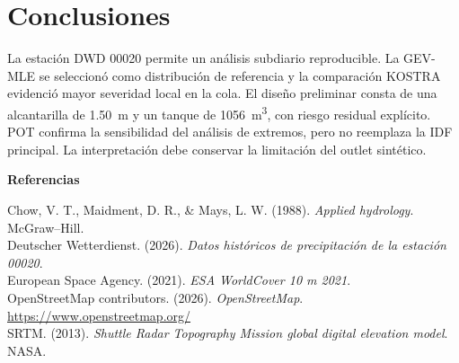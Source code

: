 \documentclass[man]{apa7}
\begin{document}
\section{Conclusiones}
La estación DWD 00020 permite un análisis subdiario reproducible. La GEV-MLE se seleccionó como distribución de referencia y la comparación KOSTRA evidenció mayor severidad local en la cola. El diseño preliminar consta de una alcantarilla de \SI{1.50}{m} y un tanque de \SI{1056}{m^3}, con riesgo residual explícito. POT confirma la sensibilidad del análisis de extremos, pero no reemplaza la IDF principal. La interpretación debe conservar la limitación del outlet sintético.

\begin{flushleft}
\textbf{Referencias}\par
Chow, V. T., Maidment, D. R., \& Mays, L. W. (1988). \textit{Applied hydrology}. McGraw--Hill.\\
Deutscher Wetterdienst. (2026). \textit{Datos históricos de precipitación de la estación 00020}.\\
European Space Agency. (2021). \textit{ESA WorldCover 10 m 2021}.\\
OpenStreetMap contributors. (2026). \textit{OpenStreetMap}. \url{https://www.openstreetmap.org/}\\
SRTM. (2013). \textit{Shuttle Radar Topography Mission global digital elevation model}. NASA.
\end{flushleft}
\end{document}
